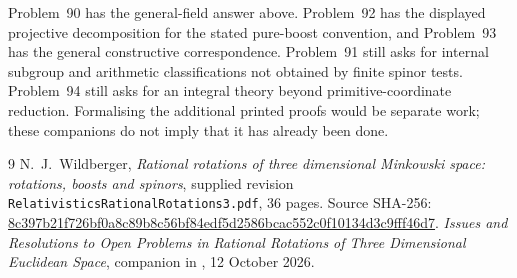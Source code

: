 \documentclass[11pt]{article}
\theoremstyle{remark}
\begin{document}
Problem~90 has the general-field answer above. Problem~92 has the displayed
projective decomposition for the stated pure-boost convention, and
Problem~93 has the general constructive correspondence. Problem~91 still
asks for internal subgroup and arithmetic classifications not obtained by
finite spinor tests. Problem~94 still asks for an integral theory beyond
primitive-coordinate reduction. Formalising the additional printed proofs
would be separate work; these companions do not imply that it has already
been done.

\begin{thebibliography}{9}
 N.~J.~Wildberger,
\emph{Rational rotations of three dimensional Minkowski space: rotations,
boosts and spinors}, supplied revision
\texttt{RelativisticsRationalRotations3.pdf}, 36 pages.
Source SHA-256:
\url{8c397b21f726bf0a8c89b8c56bf84edf5d2586bcac552c0f10134d3c9fff46d7}.
 \emph{Issues and Resolutions to Open Problems in Rational
Rotations of Three Dimensional Euclidean Space}, companion in
,
12 October 2026.
\end{thebibliography}
\end{document}
